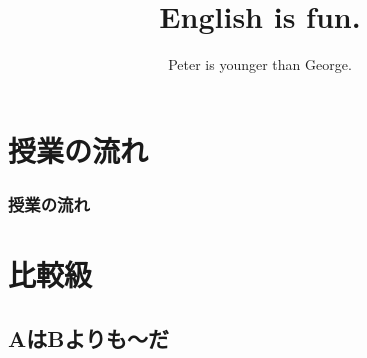 \documentclass[aspectratio=169,xcolor={dvipsnames,table}]{beamer}
\title{English is fun.}
\subtitle{Peter is younger than George.}
\author{}
\institute[]{}
\date[]
\begin{document}
\begin{frame}[plain]
  \titlepage
\end{frame}

\section*{授業の流れ}
\begin{frame}[plain]
  \frametitle{授業の流れ}
  \tableofcontents
\end{frame}

\section{比較級}
\subsection{AはBよりも〜だ}
\end{document}
